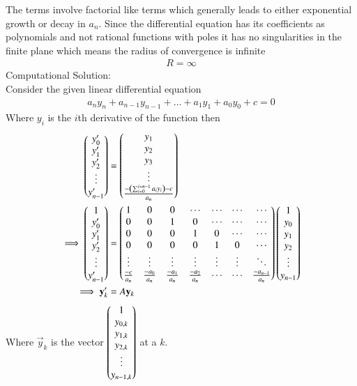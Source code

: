 \documentclass[journal]{IEEEtran}
\begin{document}
The terms involve factorial like terms which generally leads to either exponential growth or decay in $a_n$. Since the differential equation has its coefficients as polynomials and not rational functions with poles it has no singularities in the finite plane which means the radius of convergence is infinite
\begin{align}
    R=\infty
\end{align}
Computational Solution:\\
Consider the given linear differential equation
\begin{align}
	a_{n}y_{n} + a_{n-1}y_{n-1} + \dots + a_{1}y_1 + a_{0}y_{0} + c = 0
\end{align}
Where $y_{i}$ is the $i$th derivative of the function then
\begin{align}
    \begin{pmatrix}y_{0}^{\prime}\\y_{1}^{\prime}\\y_{2}^{\prime}\\ \vdots\\y^{\prime}_{n-1}\end{pmatrix}&=\begin{pmatrix}y_{1}\\y_{2}\\y_{3}\\ \vdots\\ \frac{-\left(\sum_{i=0}^{i=n-1}a_iy_i\right)-c}{a_n}\end{pmatrix}\\
    \implies  \begin{pmatrix}1\\y_{0}^{\prime}\\y_{1}^{\prime}\\y_{2}^{\prime}\\ \vdots\\y^{\prime}_{n-1}\end{pmatrix}&=\begin{pmatrix}1&0&0&\cdots&\cdots&\cdots&\cdots\\0&0&1&0&\cdots&\cdots&\cdots\\0&0&0&1&0&\cdots&\cdots\\0&0&0&0&1&0&\cdots\\ \vdots&\vdots&\vdots&\vdots&\vdots&\vdots&\ddots\\ \frac{-c}{a_n}&\frac{-a_{0}}{a_n}&\frac{-a_{1}}{a_n}&\frac{-a_{2}}{a_n}&\cdots&\cdots&\frac{-a_{n-1}}{a_n}\end{pmatrix}\begin{pmatrix}1\\y_{0}\\y_{1}\\y_{2}\\ \vdots\\y_{n-1}\end{pmatrix}\\
    \implies \mathbf{y}_k^{\prime}&=A\mathbf{y}_k
\end{align}
Where $\vec{y}_k$ is the vector $\begin{pmatrix}1\\y_{0,k}\\y_{1,k}\\y_{2,k}\\ \vdots\\y_{n-1,k}\end{pmatrix}$ at a $k$.\\
\end{document}
